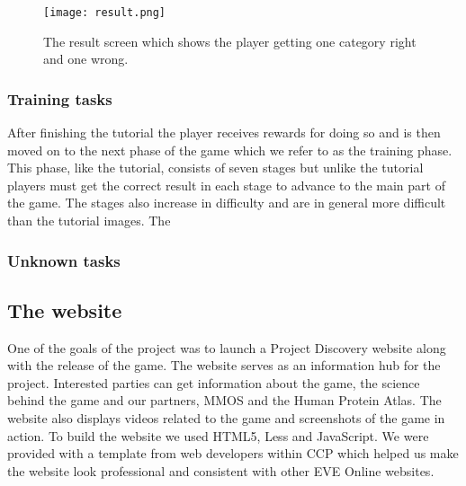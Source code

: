 		\begin{figure}[H]
		  \centering
		  \graphicspath{ {./graphics/} }
		  \centerline{\texttt{[image: result.png]}}
		  \caption{\label{fig:result}The result screen which shows the player getting one category right and one wrong.}
		\end{figure}

	\subsubsection{Training tasks}
		After finishing the tutorial the player receives rewards for doing so and is then moved on to the next phase of the game which we refer to as the training phase. This phase, like the tutorial, consists of seven stages but unlike the tutorial players must get the correct result in each stage to advance to the main part of the game. The stages also increase in difficulty and are in general more difficult than the tutorial images. The 

	\subsubsection{Unknown tasks}

\subsection{The website}
	One of the goals of the project was to launch a Project Discovery website along with the release of the game. The website serves as an information hub for the project. Interested parties can get information about the game, the science behind the game and our partners, MMOS and the Human Protein Atlas. The website also displays videos related to the game and screenshots of the game in action. To build the website we used HTML5, Less and JavaScript. We were provided with a template from web developers within CCP which helped us make the website look professional and consistent with other EVE Online websites.

